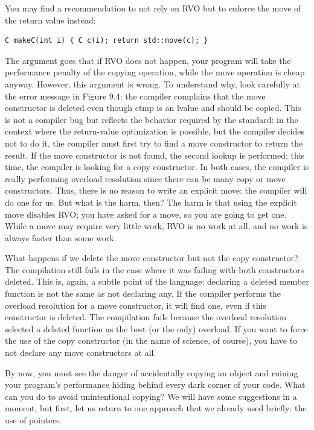 You may find a recommendation to not rely on RVO but to enforce the move of the return value instead:

\begin{lstlisting}[style=styleCXX]
C makeC(int i) { C c(i); return std::move(c); }
\end{lstlisting}

The argument goes that if RVO does not happen, your program will take the performance penalty of the copying operation, while the move operation is cheap anyway. However, this argument is wrong. To understand why, look carefully at the error message in Figure 9.4: the compiler complains that the move constructor is deleted even though ctmp is an lvalue and should be copied. This is not a compiler bug but reflects the behavior required by the standard: in the context where the return-value optimization is possible, but the compiler decides not to do it, the compiler must first try to find a move constructor to return the result. If the move constructor is not found, the second lookup is performed; this time, the compiler is looking for a copy constructor. In both cases, the compiler is really performing overload resolution since there can be many copy or move constructors. Thus, there is no reason to write an explicit move: the compiler will do one for us. But what is the harm, then? The harm is that using the explicit move disables RVO; you have asked for a move, so you are going to get one. While a move may require very little work, RVO is no work at all, and no work is always faster than some work.

What happens if we delete the move constructor but not the copy constructor? The compilation still fails in the case where it was failing with both constructors deleted. This is, again, a subtle point of the language: declaring a deleted member function is not the same as not declaring any. If the compiler performs the overload resolution for a move constructor, it will find one, even if this constructor is deleted. The compilation fails because the overload resolution selected a deleted function as the best (or the only) overload. If you want to force the use of the copy constructor (in the name of science, of course), you have to not declare any move constructors at all. 

By now, you must see the danger of accidentally copying an object and ruining your program’s performance hiding behind every dark corner of your code. What can you do to avoid unintentional copying? We will have some suggestions in a moment, but first, let us return to one approach that we already used briefly: the use of pointers.

